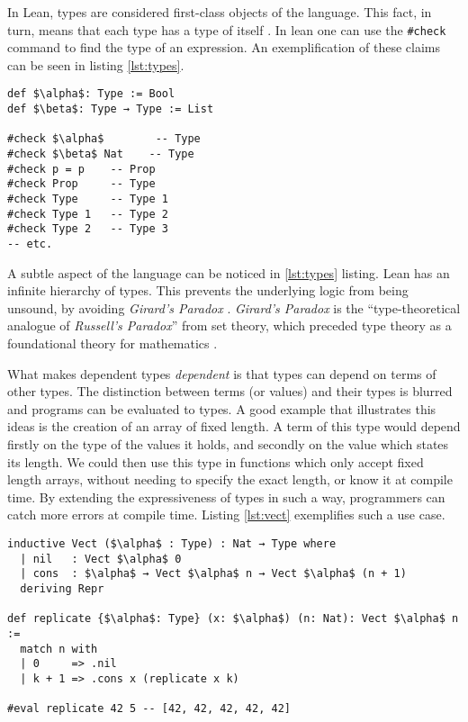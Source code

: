 \documentclass[runningheads]{llncs}
\begin{document}
In Lean, types are considered first-class objects of the language. This fact,
in turn, means that each type has a type of itself
\cite{theorem_proving_in_lean4}. In lean one can use the \lstinline{#check}
command to find the type of an expression. An exemplification of these claims
can be seen in listing \ref{lst:types}.

\vspace{3mm}

\begin{lstlisting}[caption=Types are first class objects in Lean,
    mathescape, label=lst:types]
def $\alpha$: Type := Bool
def $\beta$: Type → Type := List

#check $\alpha$        -- Type
#check $\beta$ Nat    -- Type 
#check p = p    -- Prop
#check Prop     -- Type
#check Type     -- Type 1
#check Type 1   -- Type 2
#check Type 2   -- Type 3
-- etc.
\end{lstlisting}

A subtle aspect of the language can be noticed in \ref{lst:types} listing. Lean
has an infinite hierarchy of types. This prevents the underlying logic from
being unsound, by avoiding \emph{Girard's Paradox} \cite{girard}.
\emph{Girard's Paradox} is the ``type-theoretical analogue of \emph{Russell's
Paradox}'' from set theory, which preceded type theory as a foundational theory
for mathematics \cite{russell} \cite{systemu}.

What makes dependent types \emph{dependent} is that types can depend on
terms of other types. The distinction between terms (or values) and their
types is blurred and programs can be evaluated to types. A good example 
that illustrates this ideas is the creation of an array of fixed length.
A term of this type would depend firstly on the type of the values it holds,
and secondly on the value which states its length. We could then use this
type in functions which only accept fixed length arrays, without needing
to specify the exact length, or know it at compile time. By extending the 
expressiveness of types in such a way, programmers can catch more errors 
at compile time. Listing \ref{lst:vect} exemplifies such a use case.

\vspace{3mm}

\begin{lstlisting}[mathescape, label=lst:vect, 
    caption=Defining a fixed-size list type and defining a function
    which produces a fixed-size list based on input parameters]
inductive Vect ($\alpha$ : Type) : Nat → Type where
  | nil   : Vect $\alpha$ 0
  | cons  : $\alpha$ → Vect $\alpha$ n → Vect $\alpha$ (n + 1)
  deriving Repr

def replicate {$\alpha$: Type} (x: $\alpha$) (n: Nat): Vect $\alpha$ n :=
  match n with
  | 0     => .nil
  | k + 1 => .cons x (replicate x k)

#eval replicate 42 5 -- [42, 42, 42, 42, 42]
\end{lstlisting}
\end{document}

